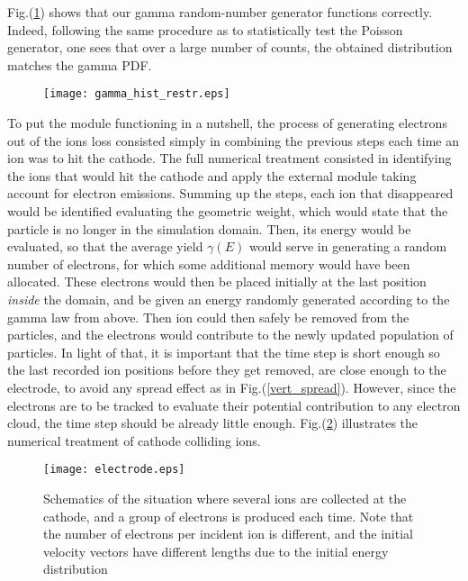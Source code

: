 \noindent Fig.(\ref{gamma_hist}) shows that our gamma random-number generator functions correctly. Indeed, following the same procedure as to statistically test the Poisson generator, one sees that over a large number of counts, the obtained distribution matches the gamma PDF. 

\begin{figure}[h!]
\centering
	\texttt{[image: gamma\_hist\_restr.eps]}
	\caption{\label{gamma_hist}  }
\end{figure}  



To put the module functioning in a nutshell, the process of generating electrons out of the ions loss consisted simply in combining the previous steps each time an ion was to hit the cathode. The full numerical treatment consisted in identifying the ions that would hit the cathode and apply the external module taking account for electron emissions. Summing up the steps, each ion that disappeared would be identified evaluating the geometric weight, which would state that the particle is no longer in the simulation domain. Then, its energy would be evaluated, so that the average yield $\gamma(E)$ would serve in generating a random number of electrons, for which some additional memory would have been allocated. These electrons would then be placed initially at the last position \emph{inside} the domain, and be given an energy randomly generated according to the gamma law from above. Then ion could then safely be removed from the particles, and the electrons would contribute to the newly updated population of particles. In light of that, it is important that the time step is short enough so the last recorded ion positions before they get removed, are close enough to the electrode, to avoid any spread effect as in Fig.(\ref{vert_spread}). However, since the electrons are to be tracked to evaluate their potential contribution to any electron cloud, the time step should be already little enough. Fig.(\ref{scheme}) illustrates the numerical treatment of cathode colliding ions. 

\begin{figure}[h!]
\centering
	\texttt{[image: electrode.eps]}
	\caption{\label{scheme} Schematics of the situation where several ions are collected at the cathode, and a group of electrons is produced each time. Note that the number of electrons per incident ion is different, and the initial velocity vectors have different lengths due to the initial energy distribution}
\end{figure}  




